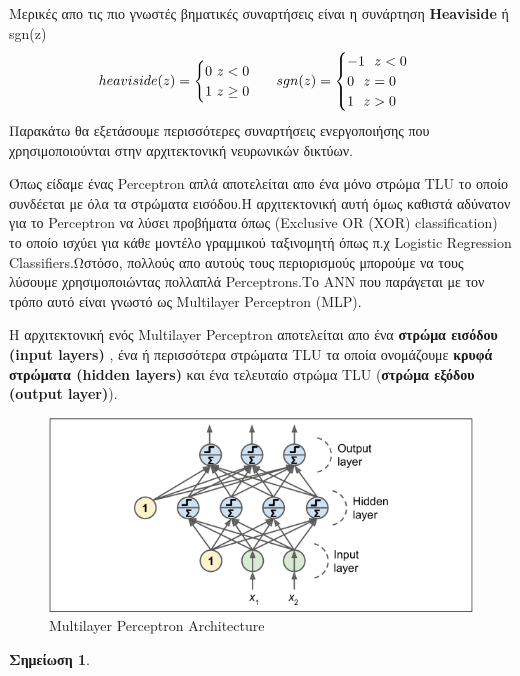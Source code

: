 \documentclass[12pt,a4paper]{article}
\newtheorem{note}{Σημείωση}
\begin{document}
Μερικές απο τις πιο γνωστές βηματικές συναρτήσεις είναι η συνάρτηση \textbf{Heaviside} ή sgn(z)
$$heaviside(z) =\begin{cases}
0 \ z<0 \\
1 \ z\geq 0\\
\end{cases} \ \ \ \\ sgn(z) =\begin{cases}
-1 \ \ z<0\\
0 \ \ z=0\\
1 \ \ z>0\\
\end{cases}$$
Παρακάτω θα εξετάσουμε περισσότερες συναρτήσεις ενεργοποιήσης που χρησιμοποιούνται στην αρχιτεκτονική νευρωνικών δικτύων.

\par Όπως είδαμε ένας Perceptron απλά αποτελείται απο ένα μόνο στρώμα TLU το οποίο συνδέεται με όλα τα στρώματα εισόδου.Η αρχιτεκτονική αυτή όμως καθιστά αδύνατον για το Perceptron να λύσει προβήματα όπως (Exclusive OR (XOR) classification) το οποίο ισχύει για κάθε μοντέλο γραμμικού ταξινομητή όπως π.χ Logistic Regression Classifiers.Ωστόσο, πολλούς απο αυτούς τους περιορισμούς μπορούμε να τους λύσουμε χρησιμοποιώντας πολλαπλά Perceptrons.Το ANN που παράγεται με τον τρόπο αυτό είναι γνωστό ως Multilayer Perceptron (MLP).

\par Η αρχιτεκτονική ενός Multilayer Perceptron αποτελείται απο ένα \textbf{στρώμα εισόδου (input layers)} , ένα ή περισσότερα στρώματα TLU τα οποία ονομάζουμε \textbf{κρυφά στρώματα (hidden layers)} και ένα τελευταίο στρώμα TLU (\textbf{στρώμα εξόδου (output layer)}).

\begin{figure}[H]
\centering
\includegraphics[width=0.60\linewidth,height=0.20\textheight]{Images/plot15}
\caption{Multilayer Perceptron Architecture}
\label{fig:multi}
\end{figure}

\begin{note}
  \end{note}
\end{document}
